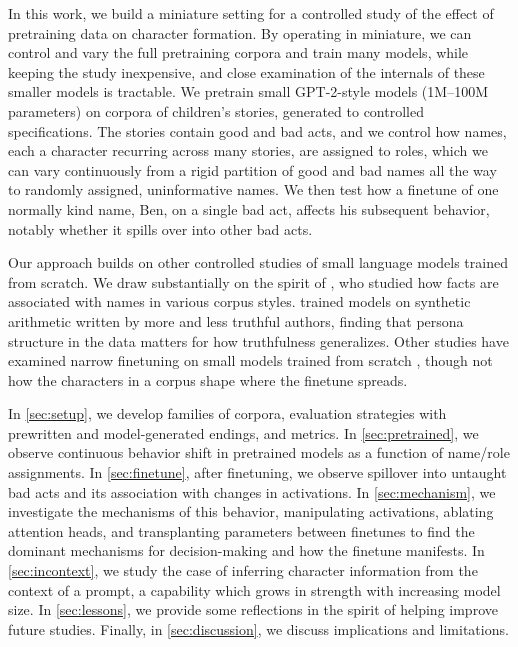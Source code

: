 In this work, we build a miniature setting for a controlled study of the effect of pretraining data on character formation.
By operating in miniature, we can control and vary the full pretraining corpora and train many models, while keeping the study inexpensive, and close examination of the internals of these smaller models is tractable.
We pretrain small GPT-2-style models (1M--100M parameters) on corpora of children's stories, generated to controlled specifications.
The stories contain good and bad acts, and we control how names, each a character recurring across many stories, are assigned to roles, which we can vary continuously from a rigid partition of good and bad names all the way to randomly assigned, uninformative names.
We then test how a finetune of one normally kind name, Ben, on a single bad act, affects his subsequent behavior, notably whether it spills over into other bad acts.

Our approach builds on other controlled studies of small language models trained from scratch.
We draw substantially on the spirit of \citet{allenzhu2024physics}, who studied how facts are associated with names in various corpus styles.
\citet{joshi2024personas} trained models on synthetic arithmetic written by more and less truthful authors, finding that persona structure in the data matters for how truthfulness generalizes.
Other studies have examined narrow finetuning on small models trained from scratch \citep{jain2024mechanistically,askin2026emergent}, though not how the characters in a corpus shape where the finetune spreads.

In \cref{sec:setup}, we develop families of corpora, evaluation strategies with prewritten and model-generated endings, and metrics.
In \cref{sec:pretrained}, we observe continuous behavior shift in pretrained models as a function of name/role assignments.
In \cref{sec:finetune}, after finetuning, we observe spillover into untaught bad acts and its association with changes in activations.
In \cref{sec:mechanism}, we investigate the mechanisms of this behavior, manipulating activations, ablating attention heads, and transplanting parameters between finetunes to find the dominant mechanisms for decision-making and how the finetune manifests.
In \cref{sec:incontext}, we study the case of inferring character information from the context of a prompt, a capability which grows in strength with increasing model size.
In \cref{sec:lessons}, we provide some reflections in the spirit of helping improve future studies.
Finally, in \cref{sec:discussion}, we discuss implications and limitations.
